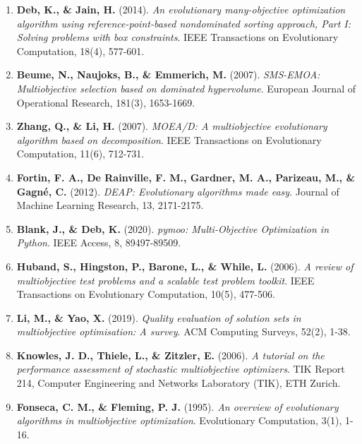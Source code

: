 \begin{enumerate}
    \item \textbf{Deb, K., \& Jain, H.} (2014). \textit{An evolutionary many-objective optimization algorithm using reference-point-based nondominated sorting approach, Part I: Solving problems with box constraints}. IEEE Transactions on Evolutionary Computation, 18(4), 577-601.
    
    \item \textbf{Beume, N., Naujoks, B., \& Emmerich, M.} (2007). \textit{SMS-EMOA: Multiobjective selection based on dominated hypervolume}. European Journal of Operational Research, 181(3), 1653-1669.
    
    \item \textbf{Zhang, Q., \& Li, H.} (2007). \textit{MOEA/D: A multiobjective evolutionary algorithm based on decomposition}. IEEE Transactions on Evolutionary Computation, 11(6), 712-731.
    
    \item \textbf{Fortin, F. A., De Rainville, F. M., Gardner, M. A., Parizeau, M., \& Gagné, C.} (2012). \textit{DEAP: Evolutionary algorithms made easy}. Journal of Machine Learning Research, 13, 2171-2175.
    
    \item \textbf{Blank, J., \& Deb, K.} (2020). \textit{pymoo: Multi-Objective Optimization in Python}. IEEE Access, 8, 89497-89509.
    
    \item \textbf{Huband, S., Hingston, P., Barone, L., \& While, L.} (2006). \textit{A review of multiobjective test problems and a scalable test problem toolkit}. IEEE Transactions on Evolutionary Computation, 10(5), 477-506.
    
    \item \textbf{Li, M., \& Yao, X.} (2019). \textit{Quality evaluation of solution sets in multiobjective optimisation: A survey}. ACM Computing Surveys, 52(2), 1-38.
    
    \item \textbf{Knowles, J. D., Thiele, L., \& Zitzler, E.} (2006). \textit{A tutorial on the performance assessment of stochastic multiobjective optimizers}. TIK Report 214, Computer Engineering and Networks Laboratory (TIK), ETH Zurich.
    
    \item \textbf{Fonseca, C. M., \& Fleming, P. J.} (1995). \textit{An overview of evolutionary algorithms in multiobjective optimization}. Evolutionary Computation, 3(1), 1-16.
    

\end{enumerate}
